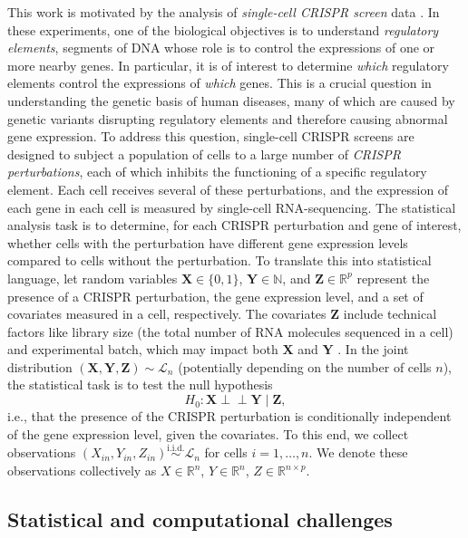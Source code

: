 \documentclass[12pt]{article}
\theoremstyle{definition}
\newcommand{\indep}{\perp \!\!\! \perp}
\newcommand{\R}{\mathbb{R}}								%
\newcommand{\N}{\mathbb{N}}								%
\newcommand{\iidsim}{\stackrel{\mathrm{i.i.d.}}{\sim}} 	%
\newcommand{\prx}{\bm X}								%
\newcommand{\srx}{X}									%
\newcommand{\prz}{\bm Z}								%
\newcommand{\srz}{Z}									%
\newcommand{\pry}{{\bm Y}}								%
\newcommand{\sry}{Y}									%
\newcommand{\law}{\mathcal L}							%
\begin{document}
This work is motivated by the analysis of \textit{single-cell CRISPR screen} data \citep{Dixit2016,Adamson2016,Jaitin2016,Datlinger2017}. In these experiments, one of the biological objectives is to understand \textit{regulatory elements}, segments of DNA whose role is to control the expressions of one or more nearby genes. In particular, it is of interest to determine \textit{which} regulatory elements control the expressions of \textit{which} genes. This is a crucial question in understanding the genetic basis of human diseases, many of which are caused by genetic variants disrupting regulatory elements and therefore causing abnormal gene expression. To address this question, single-cell CRISPR screens are designed to subject a population of cells to a large number of \textit{CRISPR perturbations}, each of which inhibits the functioning of a specific regulatory element. Each cell receives several of these perturbations, and the expression of each gene in each cell is measured by single-cell RNA-sequencing. The statistical analysis task is to determine, for each CRISPR perturbation and gene of interest, whether cells with the perturbation have different gene expression levels compared to cells without the perturbation. To translate this into statistical language, let random variables $\prx \in \{0,1\}$, $\pry \in \N$, and $\prz \in \R^p$ represent the presence of a CRISPR perturbation, the gene expression level, and a set of covariates measured in a cell, respectively. The covariates $\prz$ include technical factors like library size (the total number of RNA molecules sequenced in a cell) and experimental batch, which may impact both $\prx$ and $\pry$ \citep{Katsevich2020c}. In the joint distribution $(\prx, \pry, \prz) \sim \law_n$ (potentially depending on the number of cells $n$), the statistical task is to test the null hypothesis 
\begin{equation}
H_0: \prx \indep \pry \mid \prz, 
\end{equation}
i.e., that the presence of the CRISPR perturbation is conditionally independent of the gene expression level, given the covariates. To this end, we collect observations $(\srx_{in}, \sry_{in}, \srz_{in}) \iidsim \law_n$ for cells $i = 1, \dots, n$. We denote these observations collectively as $\srx \in \R^n$, $\sry \in \R^n$, $\srz \in \R^{n \times p}$.

\subsection{Statistical and computational challenges} \label{sec:statistical-computational-challenges}
\end{document}
